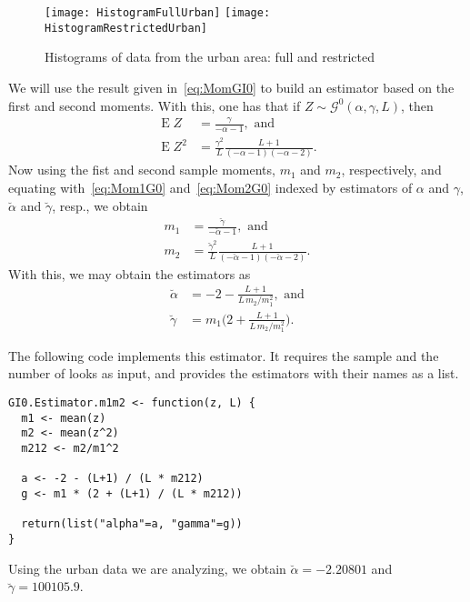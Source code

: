 \begin{figure}[hbt]
\centering
\texttt{[image: HistogramFullUrban]}
\texttt{[image: HistogramRestrictedUrban]}
\caption{Histograms of data from the urban area: full and restricted}\label{Fig:HistogramsUrbanAreas}
\end{figure}

We will use the result given in~\eqref{eq:MomGI0} to build an estimator based on the first and second moments.
With this, one has that if $Z\sim\mathcal{G}^0(\alpha,\gamma,L)$, then
\begin{align}
\operatorname{E}Z	&= \frac{\gamma}{-\alpha-1}, \text{ and } \label{eq:Mom1G0} \\
\operatorname{E}Z^2	&= \frac{\gamma^2}{L}\frac{L+1}{(-\alpha-1)(-\alpha-2)}. \label{eq:Mom2G0}
\end{align}
Now using the fist and second sample moments, $m_1$ and $m_2$, respectively, and equating with~\eqref{eq:Mom1G0} and~\ref{eq:Mom2G0} indexed by estimators of $\alpha$ and $\gamma$, $\breve{\alpha}$ and $\breve{\gamma}$, resp., we obtain
\begin{align}
m_1	&= \frac{\breve\gamma}{-\breve\alpha-1}, \text{ and } \label{eq:SMom1G0} \\
m_2	&= \frac{\breve\gamma^2}{L}\frac{L+1}{(-\breve\alpha-1)(-\breve\alpha-2)}. \label{eq:SMom2G0}
\end{align}
With this, we may obtain the estimators as
\begin{align}
\breve{\alpha}	& = -2-\frac{L+1}{L\, m_2/m_1^2}, \text{ and} \label{Eq:EstMoma}\\
\breve\gamma		& = m_1 \Big(2+\frac{L+1}{L\, m_2/m_1^2}\Big).\label{Eq:EstMomb}
\end{align}

The following code implements this estimator.
It requires the sample and the number of looks as input,
and provides the estimators with their names as a list.

\begin{lstlisting}[frame=lines]
GI0.Estimator.m1m2 <- function(z, L) {
  m1 <- mean(z)
  m2 <- mean(z^2)
  m212 <- m2/m1^2
    
  a <- -2 - (L+1) / (L * m212)
  g <- m1 * (2 + (L+1) / (L * m212))
  
  return(list("alpha"=a, "gamma"=g))
}
\end{lstlisting}

Using the urban data we are analyzing, we obtain
$\breve{\alpha}=-2.20801$ and $\breve\gamma=100105.9$.

